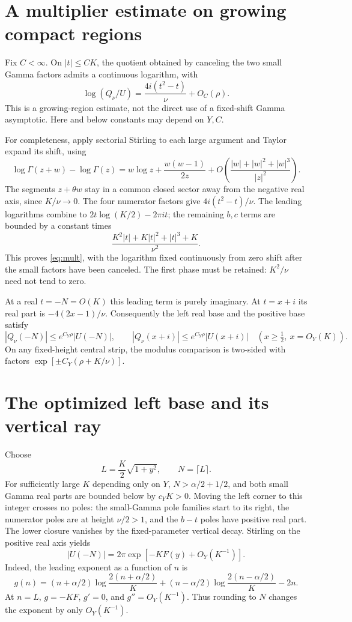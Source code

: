 \documentclass[11pt,a4paper]{article}
\begin{document}
\section{A multiplier estimate on growing compact regions}
Fix \(C<\infty\). On \(|t|\le CK\), the quotient obtained by canceling
the two small Gamma factors admits a continuous logarithm, with
\begin{equation}\label{eq:mult}
 \log(Q_\nu/U)=\frac{4i(t^2-t)}{\nu}+O_C(\rho).
\end{equation}
This is a growing-region estimate, not the direct use of a fixed-shift
Gamma asymptotic. Here and below constants may depend on \(Y,C\).

For completeness, apply sectorial Stirling to each large argument and
Taylor expand its shift, using
\[
 \log\Gamma(z+w)-\log\Gamma(z)
 =w\log z+\frac{w(w-1)}{2z}
 +O\!\left(\frac{|w|+|w|^2+|w|^3}{|z|^2}\right).
\]
The segments \(z+\theta w\) stay in a common closed sector away from
the negative real axis, since \(K/\nu\to0\).
The four numerator factors give \(4i(t^2-t)/\nu\).
The leading logarithms combine to
\(2t\log(K/2)-2\pi it\); the remaining \(b,c\) terms are bounded
by a constant times
\[
 \frac{K^2|t|+K|t|^2+|t|^3+K}{\nu^2}.
\]
This proves \eqref{eq:mult}, with the logarithm fixed continuously
from zero shift after the small factors have been canceled.
The first phase must be retained: \(K^2/\nu\) need not tend to zero.

At a real \(t=-N=O(K)\) this leading term is purely imaginary.
At \(t=x+i\) its real part is \(-4(2x-1)/\nu\).
Consequently the left real base and the positive base satisfy
\[
 |Q_\nu(-N)|\le e^{C_Y\rho}|U(-N)|,\qquad
 |Q_\nu(x+i)|\le e^{C_Y\rho}|U(x+i)|\quad (x\ge\tfrac12,\ x=O_Y(K)).
\]
On any fixed-height central strip, the modulus comparison is two-sided
with factors \(\exp[\pm C_Y(\rho+K/\nu)]\).

\section{The optimized left base and its vertical ray}
Choose
\[
 L=\frac K2\sqrt{1+y^2},\qquad N=\lceil L\rceil.
\]
For sufficiently large \(K\) depending only on \(Y\),
\(N>\alpha/2+1/2\), and both small Gamma real parts are bounded below
by \(c_YK>0\). Moving the left corner to this integer crosses no poles:
the small-Gamma pole families start to its right, the numerator poles
are at height \(\nu/2>1\), and the \(b-t\) poles have positive real part.
The lower closure vanishes by the fixed-parameter vertical decay.
Stirling on the positive real axis yields
\begin{equation}\label{eq:base}
 |U(-N)|=2\pi\exp[-KF(y)+O_Y(K^{-1})].
\end{equation}
Indeed, the leading exponent as a function of \(n\) is
\[
 g(n)=(n+\alpha/2)\log\frac{2(n+\alpha/2)}K
 +(n-\alpha/2)\log\frac{2(n-\alpha/2)}K-2n.
\]
At \(n=L\), \(g=-KF\), \(g'=0\), and \(g''=O_Y(K^{-1})\).
Thus rounding to \(N\) changes the exponent by only \(O_Y(K^{-1})\).
\end{document}
